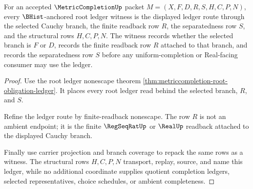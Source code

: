 \begin{theorem}
\label{thm:metriccompletion-root-obligation-ledger-witness}
For an accepted $\MetricCompletionUp$ packet $M=(X,F,D,R,S,H,C,P,N)$, every $\BHist$-anchored root ledger witness is the displayed ledger route through the selected Cauchy branch, the finite readback row $R$, the separatedness row $S$, and the structural rows $H,C,P,N$. The witness records whether the selected branch is $F$ or $D$, records the finite readback row $R$ attached to that branch, and records the separatedness row $S$ before any uniform-completion or Real-facing consumer may use the ledger.
\end{theorem}
\begin{proof}
Use the root ledger nonescape theorem \autoref{thm:metriccompletion-root-obligation-ledger}. It places every root ledger read behind the selected branch, $R$, and $S$.

Refine the ledger route by finite-readback nonescape. The row $R$ is not an ambient endpoint; it is the finite $\RegSeqRatUp$ or $\RealUp$ readback attached to the displayed Cauchy branch.

Finally use carrier projection and branch coverage to repack the same rows as a witness. The structural rows $H,C,P,N$ transport, replay, source, and name this ledger, while no additional coordinate supplies quotient completion ledgers, selected representatives, choice schedules, or ambient completeness.
\end{proof}

